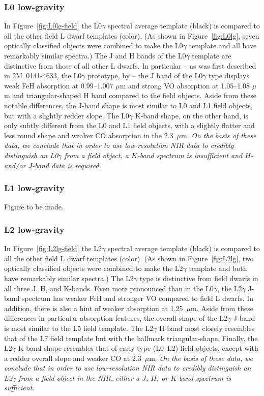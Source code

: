 \documentclass[12pt,preprint]{aastex}
\begin{document}
\subsubsection{L0 low-gravity}
In Figure~\ref{fig:L0lg-field} the L0$\gamma$ spectral average template (black) is compared to all the other field L dwarf templates (color). (As shown in Figure~\ref{fig:L0lg}, seven optically classified objects were combined to make the L0$\gamma$ template and all have remarkably similar spectra.) The J and H bands of the L0$\gamma$ template are distinctive from those of all other L dwarfs. In particular -- as was first described in 2M~0141-4633, the L0$\gamma$ prototype, by \cite{Kirkpatrick06} -- the J band of the L0$\gamma$ type displays weak FeH absorption at 0.99--1.007 $\mu$m and strong VO absorption at 1.05--1.08 $\mu$m and triangular-shaped H band compared to the field objects. Aside from these notable differences, the J-band shape is most similar to L0 and L1 field objects, but with a slightly redder slope. The L0$\gamma$ K-band shape, on the other hand, is only subtly different from the L0 and L1 field objects, with a slightly flatter and less round shape and weaker CO absorption in the 2.3~$\mu$m. 
\emph{On the basis of these data, we conclude that in order to use low-resolution NIR data to credibly distinguish an L0$\gamma$ from a field object, a $K$-band spectrum is insufficient and $H$- and/or $J$-band data is required.}

\subsubsection{L1 low-gravity}
Figure to be made.

\subsubsection{L2 low-gravity}
In Figure~\ref{fig:L2lg-field} the L2$\gamma$ spectral average template (black) is compared to all the other field L dwarf templates (color). (As shown in Figure~\ref{fig:L2lg}, two optically classified objects were combined to make the L2$\gamma$ template and both have remarkably similar spectra.) 
The L2$\gamma$ type is distinctive from field dwarfs in all three J, H, and K-bands. 
Even more pronounced than in the L0$\gamma$, the L2$\gamma$ J-band spectrum has weaker FeH and stronger VO compared to field L dwarfs. 
In addition, there is also a hint of weaker  absorption at 1.25~$\mu$m. Aside from these differences in particular absorption features, the overall shape of the L2$\gamma$ J-band is most similar to the L5 field template.
The L2$\gamma$ H-band most closely resembles that of the L7 field template but with the hallmark  triangular-shape. 
Finally, the L2$\gamma$ K-band shape resembles that of early-type (L0--L2) field objects, except with a redder overall slope and weaker CO at 2.3~$\mu$m. 
\emph{On the basis of these data, we conclude that in order to use low-resolution NIR data to credibly distinguish an L2$\gamma$ from a field object in the NIR, either a $J$, $H$, or $K$-band spectrum is sufficient.}
\end{document}

